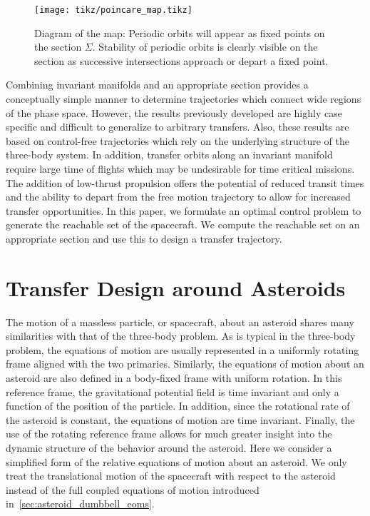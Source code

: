 \begin{figure}
    \centering
    \texttt{[image: tikz/poincare\_map.tikz]}
    \caption{Diagram of the \Poincare map: Periodic orbits will appear as fixed points on the \Poincare section \( \Sigma \). Stability of periodic orbits is clearly visible on the section as successive intersections approach or depart a fixed point.\label{fig:poincare_map}}
\end{figure}
Combining invariant manifolds and an appropriate \Poincare section provides a conceptually simple manner to determine trajectories which connect wide regions of the phase space.
However, the results previously developed are highly case specific and difficult to generalize to arbitrary transfers.
Also, these results are based on control-free trajectories which rely on the underlying structure of the three-body system.
In addition, transfer orbits along an invariant manifold require large time of flights which may be undesirable for time critical missions.
The addition of low-thrust propulsion offers the potential of reduced transit times and the ability to depart from the free motion trajectory to allow for increased transfer opportunities. 
In this paper, we formulate an optimal control problem to generate the reachable set of the spacecraft.
We compute the reachable set on an appropriate \Poincare section and use this to design a transfer trajectory.


\section{Transfer Design around Asteroids}\label{sec:sc_eoms}

The motion of a massless particle, or spacecraft, about an asteroid shares many similarities with that of the three-body problem.
As is typical in the three-body problem, the equations of motion are usually represented in a uniformly rotating frame aligned with the two primaries.
Similarly, the equations of motion about an asteroid are also defined in a body-fixed frame with uniform rotation.
In this reference frame, the gravitational potential field is time invariant and only a function of the position of the particle.
In addition, since the rotational rate of the asteroid is constant, the equations of motion are time invariant.
Finally, the use of the rotating reference frame allows for much greater insight into the dynamic structure of the behavior around the asteroid.
Here we consider a simplified form of the relative equations of motion about an asteroid.
We only treat the translational motion of the spacecraft with respect to the asteroid instead of the full coupled equations of motion introduced in~\cref{sec:asteroid_dumbbell_eoms}.

